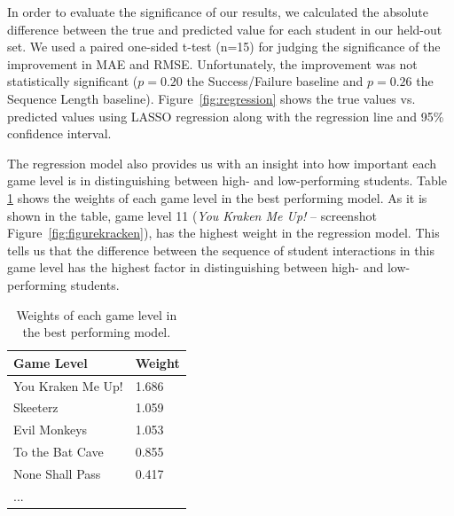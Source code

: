 \documentclass{sigchi}
\begin{document}
In order to evaluate the significance of our results, we calculated the absolute difference between the true and predicted value for each student in our held-out set.
We used a paired one-sided t-test (n=15) for judging the significance of the improvement in MAE and RMSE.
Unfortunately, the improvement was not statistically significant ($p=0.20$ the Success/Failure baseline and $p=0.26$ the Sequence Length baseline). Figure~\ref{fig:regression} shows the true values vs. predicted values using LASSO regression along with the regression line and 95\% confidence interval.

The regression model also provides us with an insight into how important each game level is in distinguishing between high- and low-performing students. Table \ref{tab:regrweights} shows the weights of each game level in the best performing model.
As it is shown in the table, game level 11 (\textit{You Kraken Me Up!} -- screenshot Figure~\ref{fig:figurekracken}), has the highest weight in the regression model. 
This tells us that the difference between the sequence of student interactions in this game level has the highest factor in distinguishing between high- and low-performing students.

\begin{table}[b]
	\centering
	\begin{tabular}{ll}
		\hline
		\textbf{Game Level} & \textbf{Weight} \\ \hline
		You Kraken Me Up!   & 1.686                               \\
		Skeeterz            & 1.059                               \\
		Evil Monkeys        & 1.053                               \\
		To the Bat Cave     & 0.855                               \\
		None Shall Pass     & 0.417                               \\
		...                 &                                    
	\end{tabular}
	\caption{Weights of each game level in the best performing model.}
	\label{tab:regrweights}	
\end{table}
\end{document}
